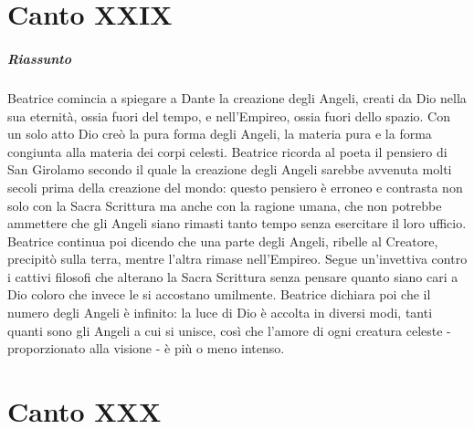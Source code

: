 \documentclass[a4paper, twoside, titlepage]{book}
\begin{document}
\chapter{Canto XXIX}

\paragraph{Riassunto} Beatrice comincia a spiegare a Dante la creazione degli Angeli, creati da Dio nella sua eternità, ossia fuori del tempo, e nell’Empireo, ossia fuori dello spazio. Con un solo atto Dio creò la pura forma degli Angeli, la materia pura e la forma congiunta alla materia dei corpi celesti. Beatrice ricorda al poeta il pensiero di San Girolamo secondo il quale la creazione degli Angeli sarebbe avvenuta molti secoli prima della creazione del mondo: questo pensiero è erroneo e contrasta non solo con la Sacra Scrittura ma anche con la ragione umana, che non potrebbe ammettere che gli Angeli siano rimasti tanto tempo senza esercitare il loro ufficio. Beatrice continua poi dicendo che una parte degli Angeli, ribelle al Creatore, precipitò sulla terra, mentre l’altra rimase nell’Empireo. Segue un’invettiva contro i cattivi filosofi che alterano la Sacra Scrittura senza pensare quanto siano cari a Dio coloro che invece le si accostano umilmente. Beatrice dichiara poi che il numero degli Angeli è infinito: la luce di Dio è accolta in diversi modi, tanti quanti sono gli Angeli a cui si unisce, così che l’amore di ogni creatura celeste - proporzionato alla visione - è più o meno intenso.

\chapter{Canto XXX}
\end{document}
